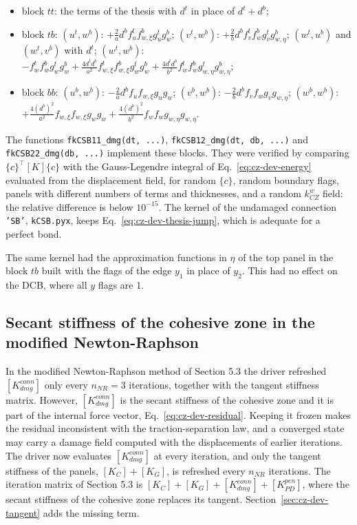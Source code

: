 \begin{itemize}
	\item block $tt$: the terms of the thesis with $d^t$ in place of $d^t + d^b$;
	\item block $tb$: $(u^t, w^b)$: $+ \frac{2}{a} d^b f^t_u f^b_{w,\xi} g^t_u g^b_w$; $(v^t, w^b)$: $+ \frac{2}{b} d^b f^t_v f^b_w g^t_v g^b_{w,\eta}$; $(w^t, u^b)$ and $(w^t, v^b)$ with $d^t$; $(w^t, w^b)$: $- f^t_w f^b_w g^t_w g^b_w + \frac{4 d^t d^b}{a^2} f^t_{w,\xi} f^b_{w,\xi} g^t_w g^b_w + \frac{4 d^t d^b}{b^2} f^t_w f^b_w g^t_{w,\eta} g^b_{w,\eta}$;
	\item block $bb$: $(u^b, w^b)$: $- \frac{2}{a} d^b f_u f_{w,\xi} g_u g_w$; $(v^b, w^b)$: $- \frac{2}{b} d^b f_v f_w g_v g_{w,\eta}$; $(w^b, w^b)$: $+ \frac{4 (d^b)^2}{a^2} f_{w,\xi} f_{w,\xi} g_w g_w + \frac{4 (d^b)^2}{b^2} f_w f_w g_{w,\eta} g_{w,\eta}$.
\end{itemize}

The functions \texttt{fkCSB11\_dmg(dt, ...)}, \texttt{fkCSB12\_dmg(dt, db, ...)} and \texttt{fkCSB22\_dmg(db, ...)} implement these blocks. They were verified by comparing $\{c\}^\top [K] \{c\}$ with the Gauss-Legendre integral of Eq.~\ref{eq:cz-dev-energy} evaluated from the displacement field, for random $\{c\}$, random boundary flags, panels with different numbers of terms and thicknesses, and a random $k^w_{CZ}$ field: the relative difference is below $10^{-15}$. The kernel of the undamaged connection \texttt{'SB'}, \texttt{kCSB.pyx}, keeps Eq.~\ref{eq:cz-dev-thesis-jump}, which is adequate for a perfect bond.

The same kernel had the approximation functions in $\eta$ of the top panel in the block $tb$ built with the flags of the edge $y_1$ in place of $y_2$. This had no effect on the DCB, where all $y$ flags are 1.

\subsection{Secant stiffness of the cohesive zone in the modified Newton-Raphson}\label{sec:cz-dev-secant}

In the modified Newton-Raphson method of Section 5.3 the driver refreshed $[K^{conn}_{dmg}]$ only every $n_{NR} = 3$ iterations, together with the tangent stiffness matrix. However, $[K^{conn}_{dmg}]$ is the secant stiffness of the cohesive zone and it is part of the internal force vector, Eq.~\ref{eq:cz-dev-residual}. Keeping it frozen makes the residual inconsistent with the traction-separation law, and a converged state may carry a damage field computed with the displacements of earlier iterations. The driver now evaluates $[K^{conn}_{dmg}]$ at every iteration, and only the tangent stiffness of the panels, $[K_C] + [K_G]$, is refreshed every $n_{NR}$ iterations. The iteration matrix of Section 5.3 is $[K_C] + [K_G] + [K^{conn}_{dmg}] + [K^{pen}_{PD}]$, where the secant stiffness of the cohesive zone replaces its tangent. Section~\ref{sec:cz-dev-tangent} adds the missing term.

